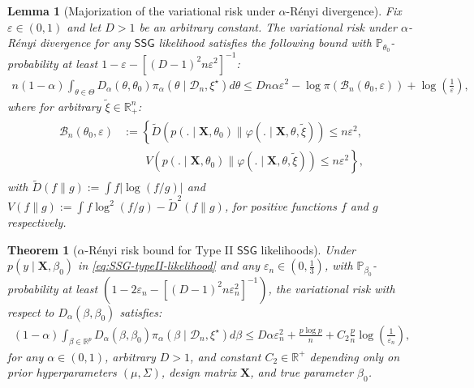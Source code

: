 \documentclass[10pt,a4paper]{amsart}
\newtheorem{theorem}{Theorem}
\newtheorem{lemma}{Lemma}
\newcommand{\ssg}{\mathsf{SSG}}
\begin{document}
\begin{lemma}[Majorization of the variational risk under $\alpha$-R\'{e}nyi divergence]\label{lemma:majorization-Renyi}
Fix $\varepsilon \in (0, 1)$ and let $D>1$ be an arbitrary constant. The variational risk under $\alpha$-R\'{e}nyi divergence for any $\mathsf{SSG}$ likelihood satisfies the following bound with $\mathbb{P}_{\theta_0}$-probability at least $1-\varepsilon - [(D-1)^2n\varepsilon^2]^{-1}$:
\begin{align}\label{eq:lemma-majorization-renyi-1}
        n(1-\alpha)\int_{\theta\in \Theta}D_{\alpha}(\theta, \theta_{0})\pi_{\alpha}(\theta \mid \mathcal{D}_n, \xi^{\star})d\theta
        \leq Dn\alpha\varepsilon^2 - \log \pi(\mathcal{B}_n(\theta_0, \varepsilon)) + \log\left(\frac{1}{\varepsilon}\right),
\end{align}
where for arbitrary $\tilde{\xi} \in \mathbb{R}_{+}^{n}$:
\begin{align}\label{eq:lemma-majorization-renyi-2}
    \begin{split}
        \mathcal{B}_{n}(\theta_0, \varepsilon) &:= \left\{\tilde{D}\left(p(.\mid \mathbf{X}, \theta_{0}) \parallel \varphi(.\mid \mathbf{X}, \theta, \tilde{\xi})\right)\leq n\varepsilon^2,
        \right.\\&\left.\qquad 
        {V}\left(p(.\mid \mathbf{X}, \theta_0) \parallel \varphi(.\mid \mathbf{X}, \theta, \tilde{\xi})\right)\leq n\varepsilon^2\right\},
    \end{split}
\end{align}
with $\tilde{D}(f\parallel g) := \int f|\log(f/g)|$ and ${V}(f\parallel g) := \int f\log^{2}(f/g) - \tilde{D}^{2}(f\parallel g)$, for positive functions $f$ and $g$ respectively.
\end{lemma}

\begin{theorem}[$\alpha$-R\'{e}nyi risk bound for Type II $\ssg$ likelihoods]
\label{theorem-alpha-less-1-variational-risk-bound-Type-II}
Under $p(y\mid \mathbf{X}, \beta_0)$ in \eqref{eq:SSG-typeII-likelihood} and any $\varepsilon_n\in \left(0, \frac{1}{3}\right)$, with $\mathbb{P}_{\beta_0}$-probability at least $\left(1-2\varepsilon_n - [(D-1)^2n\varepsilon_n^2]^{-1}\right)$, the variational risk with respect to $D_{\alpha}(\beta, \beta_0)$ satisfies:
%
\begin{equation}\label{eq:type-2-risk-bound-alpha-less-1}
\begin{split}
(1-\alpha)\int_{\beta\in \mathbb{R}^p} D_{\alpha}(\beta, \beta_0)\pi_\alpha(\beta \mid \mathcal{D}_n, \xi^{\star})d\beta \leq D\alpha \varepsilon_n^2 + \frac{p\log p}{n} + C_2\frac{p}{n}\log\left(\frac{1}{\varepsilon_n}\right),
\end{split}
\end{equation}
%
for any $\alpha\in (0, 1)$, arbitrary $D>1$, and constant $C_2\in \mathbb{R}^{+}$ depending only on prior hyperparameters $(\mu, \Sigma)$, design matrix $\mathbf{X}$, and true parameter $\beta_0$.
\end{theorem}
\end{document}
